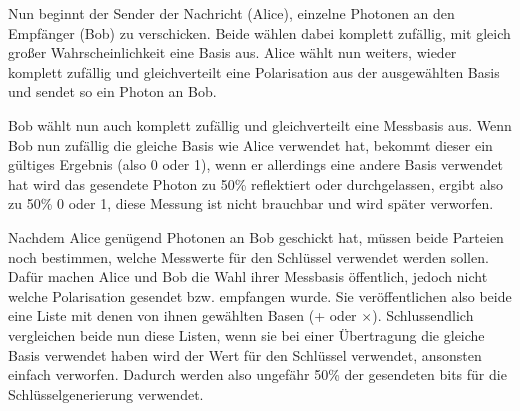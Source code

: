 Nun beginnt der Sender der Nachricht (Alice), einzelne Photonen an den Empfänger (Bob) zu verschicken. Beide wählen dabei komplett zufällig, mit gleich großer Wahrscheinlichkeit eine Basis aus. 
Alice wählt nun weiters, wieder komplett zufällig und gleichverteilt eine Polarisation aus der ausgewählten Basis und sendet so ein Photon an Bob.

Bob wählt nun auch komplett zufällig und gleichverteilt eine Messbasis aus.
Wenn Bob nun zufällig die gleiche Basis wie Alice verwendet hat, bekommt dieser ein gültiges Ergebnis (also 0 oder 1), wenn er allerdings eine andere Basis verwendet hat wird das gesendete Photon zu 50\% reflektiert oder durchgelassen, ergibt also zu 50\% 0 oder 1, diese Messung ist nicht brauchbar und wird später verworfen.

Nachdem Alice genügend Photonen an Bob geschickt hat, müssen beide Parteien noch bestimmen, welche Messwerte für den Schlüssel verwendet werden sollen.
Dafür machen Alice und Bob die Wahl ihrer Messbasis öffentlich, jedoch nicht welche Polarisation gesendet bzw. empfangen wurde. Sie veröffentlichen also beide eine Liste mit denen von ihnen gewählten Basen (+ oder $\times$).
Schlussendlich vergleichen beide nun diese Listen, wenn sie bei einer Übertragung die gleiche Basis verwendet haben wird der Wert für den Schlüssel verwendet, ansonsten einfach verworfen.
Dadurch werden also ungefähr 50\% der gesendeten bits für die Schlüsselgenerierung verwendet.

\newpage

